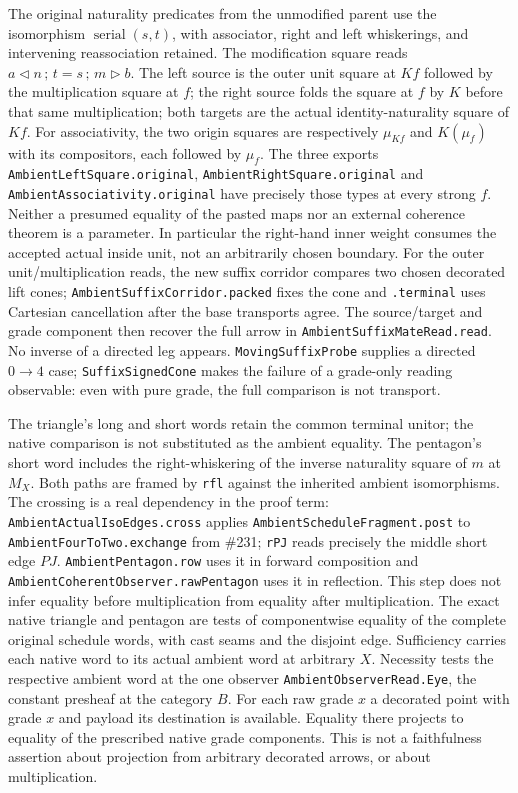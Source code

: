 \documentclass[11pt]{article}
\newcommand{\nm}[1]{\nolinkurl{#1}}
\begin{document}
The original naturality predicates from the unmodified parent use the
isomorphism $\operatorname{serial}(s,t)$, with associator, right and left
whiskerings, and intervening reassociation retained. The modification square
reads $a\mathbin{\triangleleft}n\,;\,t=s\,;\,m\mathbin{\triangleright}b$.
The left source is the outer unit square at $Kf$ followed by the multiplication
square at $f$; the right source folds the square at $f$ by $K$ before that
same multiplication; both targets are the actual identity-naturality square of
$Kf$. For associativity, the two origin squares are respectively
$\mu_{Kf}$ and $K(\mu_f)$ with its compositors, each followed by $\mu_f$.
The three exports \nm{AmbientLeftSquare.original},
\nm{AmbientRightSquare.original} and \nm{AmbientAssociativity.original}
have precisely those types at every strong $f$. Neither a presumed equality of
the pasted maps nor an external coherence theorem is a parameter. In
particular the right-hand inner weight consumes the accepted actual inside
unit, not an arbitrarily chosen boundary. For the outer unit/multiplication
reads, the new suffix corridor compares two chosen decorated lift cones;
\nm{AmbientSuffixCorridor.packed} fixes the cone and
\nm{.terminal} uses Cartesian cancellation after the base transports agree.
The source/target and grade component then recover the full arrow in
\nm{AmbientSuffixMateRead.read}. No inverse of a directed leg appears.
\nm{MovingSuffixProbe} supplies a directed $0\to4$ case;
\nm{SuffixSignedCone} makes the failure of a grade-only reading observable:
even with pure grade, the full comparison is not transport.

The triangle's long and short words retain the common terminal unitor; the
native comparison is not substituted as the ambient equality. The pentagon's
short word includes the right-whiskering of the inverse naturality square of
$m$ at $M_X$. Both paths are framed by \texttt{rfl} against the inherited
ambient isomorphisms. The crossing is a real dependency in the proof term:
\nm{AmbientActualIsoEdges.cross} applies \nm{AmbientScheduleFragment.post}
to \nm{AmbientFourToTwo.exchange} from \#231;
\nm{rPJ} reads precisely the middle short edge $PJ$.
\nm{AmbientPentagon.row} uses it in forward composition and
\nm{AmbientCoherentObserver.rawPentagon} uses it in reflection. This step
does not infer equality before multiplication from equality after
multiplication. The exact native triangle and pentagon are tests of
componentwise equality of the complete original schedule words, with cast
seams and the disjoint edge. Sufficiency carries each native word to its
actual ambient word at arbitrary $X$. Necessity tests the respective ambient
word at the one observer \nm{AmbientObserverRead.Eye}, the constant presheaf at the category $B$. For each raw grade $x$
a decorated point with grade $x$ and payload its destination is available.
Equality there projects to equality of the prescribed native grade
components. This is not a faithfulness assertion about projection from
arbitrary decorated arrows, or about multiplication.
\end{document}
